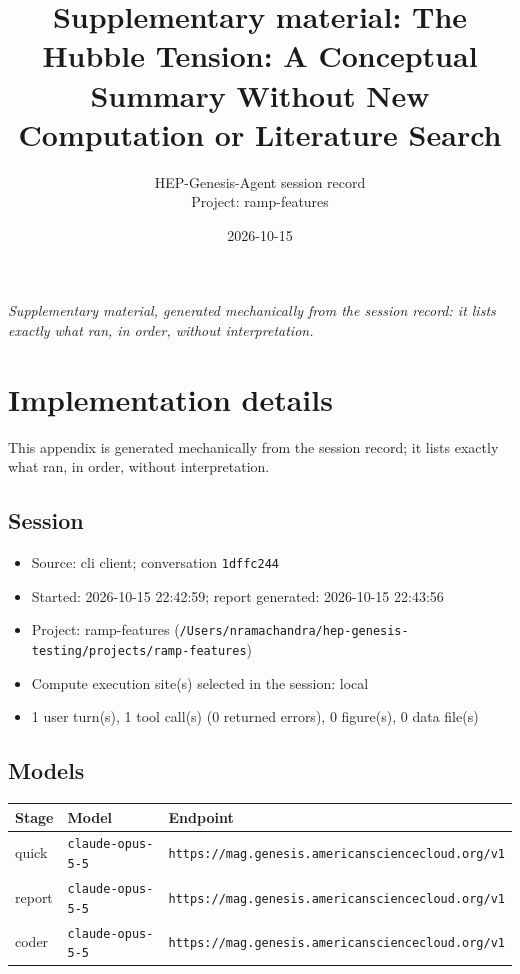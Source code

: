 \documentclass[11pt,a4paper]{article}
\title{Supplementary material: The Hubble Tension: A Conceptual Summary Without New Computation or Literature Search}
\author{HEP-Genesis-Agent session record \\ \small Project: ramp-features}
\date{2026-10-15}
\begin{document}
\maketitle
\noindent\textit{\small Supplementary material, generated mechanically from the session record: it lists exactly what ran, in order, without interpretation.}
\vspace{1em}



\appendix
\section{Implementation details}
\label{app:impl}
This appendix is generated mechanically from the session record; it lists exactly what ran, in order, without interpretation.
\subsection{Session}
\begin{itemize}
  \item Source: cli client; conversation \texttt{1dffc244}
  \item Started: 2026-10-15 22:42:59; report generated: 2026-10-15 22:43:56
  \item Project: ramp-features (\texttt{/\allowbreak{}Users/\allowbreak{}nramachandra/\allowbreak{}hep-genesis-testing/\allowbreak{}projects/\allowbreak{}ramp-features})
  \item Compute execution site(s) selected in the session: local
  \item 1 user turn(s), 1 tool call(s) (0 returned errors), 0 figure(s), 0 data file(s)
\end{itemize}
\subsection{Models}
\begin{longtable}{@{}p{}p{}p{}@{}}
\toprule Stage & Model & Endpoint \\ \midrule \endhead
quick & \texttt{claude-opus-5-5} & \texttt{https:\allowbreak{}/\allowbreak{}/\allowbreak{}mag.genesis.americansciencecloud.org/\allowbreak{}v1} \\
report & \texttt{claude-opus-5-5} & \texttt{https:\allowbreak{}/\allowbreak{}/\allowbreak{}mag.genesis.americansciencecloud.org/\allowbreak{}v1} \\
coder & \texttt{claude-opus-5-5} & \texttt{https:\allowbreak{}/\allowbreak{}/\allowbreak{}mag.genesis.americansciencecloud.org/\allowbreak{}v1} \\
\bottomrule\end{longtable}
\end{document}
